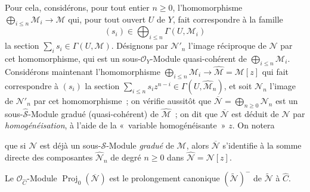 \begin{env}[8.13.2]
\label{II.8.13.2-fr}
Pour cela, considérons, pour tout entier $n\geqslant0$, l'homomorphisme
$\bigoplus_{i\leqslant n}\mathcal{M}_i\to\mathcal{M}$ qui, pour tout ouvert
$U$ de $Y$, fait correspondre à la famille
\[
  (s_i)\in\bigoplus_{i\leqslant n}\Gamma(U,\mathcal{M}_i)
\]
la section $\sum_i s_i\in\Gamma(U,\mathcal{M})$. Désignons par
$\mathcal{N}'_n$ l'image réciproque de $\mathcal{N}$ par cet homomorphisme,
qui est un sous-$\mathcal{O}_Y$-Module quasi-cohérent de
$\bigoplus_{i\leqslant n}\mathcal{M}_i$. Considérons maintenant
l'homomorphisme
$\bigoplus_{i\leqslant n}\mathcal{M}_i\to
\widehat{\mathcal{M}}=\mathcal{M}[z]$ qui fait correspondre à $(s_i)$ la
section
$\sum_{i\leqslant n}s_i z^{n-i}\in\Gamma(U,\widehat{\mathcal{M}}_n)$, et
soit $\mathcal{N}_n$ l'image de $\mathcal{N}'_n$ par cet homomorphisme~; on
vérifie aussitôt que
$\overline{\mathcal{N}}=\bigoplus_{n\geqslant0}\mathcal{N}_n$ est un
sous-$\widehat{\mathcal{S}}$-Module gradué (quasi-cohérent) de
$\widehat{\mathcal{M}}$~; on dit que $\overline{\mathcal{N}}$ est déduit de
$\mathcal{N}$ par \emph{homogénéisation}, à l'aide de la «~variable
homogénéisante~» $z$. On notera

que si $\mathcal{N}$ est déjà un sous-$\mathcal{S}$-Module \emph{gradué} de
$\mathcal{M}$, alors $\overline{\mathcal{N}}$ s'identifie à la somme directe
des composantes $\widehat{\mathcal{N}}_n$ de degré $n\geqslant0$ dans
$\widehat{\mathcal{N}}=\mathcal{N}[z]$.
\end{env}

\begin{proposition}[8.13.3]
\label{II.8.13.3-fr}
Le $\mathcal{O}_{\widehat{C}}$-Module
$\operatorname{Proj}_0(\overline{\mathcal{N}})$ est le prolongement canonique
$(\widetilde{\mathcal{N}})^{-}$ de $\widetilde{\mathcal{N}}$ à
$\widehat{C}$.
\end{proposition}

